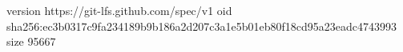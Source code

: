 version https://git-lfs.github.com/spec/v1
oid sha256:ec3b0317c9fa234189b9b186a2d207c3a1e5b01eb80f18cd95a23eadc4743993
size 95667
